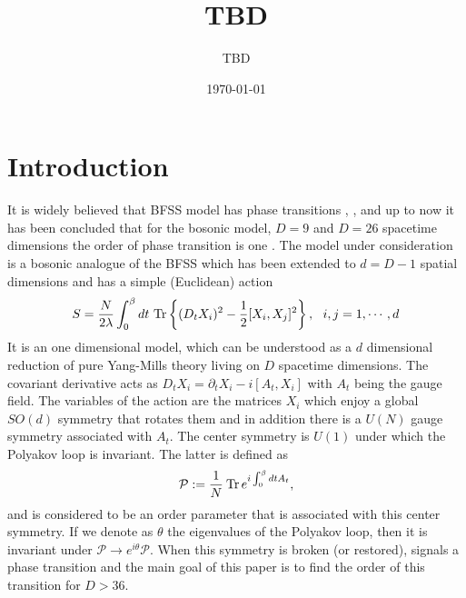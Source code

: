 \documentclass[11pt,english]{article}
\newcommand{\be}{\begin{equation}}
\newcommand{\ee}{\end{equation}}
\newcommand{\p}{\partial}
\newcommand{\Tr}[1]{\:{\rm Tr}\,#1}
\numberwithin{equation}{section}
\begin{document}
	\title{TBD}
\author{TBD}  


\date{\today}

\maketitle

\begin{abstract}
	
\end{abstract}

\newpage


\section{Introduction}
It is widely believed that BFSS model \cite{Banks1997} has phase transitions \cite{Hanada2019}, \cite{Aharony2004}, and up to now it has been concluded that for the bosonic model, $D=9$ and $D=26$ spacetime dimensions the order of phase transition is one \cite{Bergner2019}. The model under consideration is a bosonic analogue  of the BFSS which has been extended to $d=D-1$ spatial dimensions and has a simple (Euclidean) action
\be 
S = \frac{N}{2\lambda}\int_0^\beta dt\ {\rm Tr}\left\{(D_t X_i)^2 -\frac{1}{2}[X_i,X_j]^2 \right\},~~i,j=1,\cdots,d
\ee 
It is an one dimensional model, which can be understood as a $d$ dimensional reduction of pure Yang-Mills theory living on $D$ spacetime dimensions. The covariant derivative acts as $D_tX_i=\p_tX_i-i[A_t,X_i]$ with $A_t$ being the gauge field.  The variables of the action are the matrices $X_i$ which enjoy a global $SO(d)$ symmetry that rotates them and in addition there is a $U(N)$ gauge symmetry associated with $A_t$.  The center symmetry is $U(1)$ under which the Polyakov loop is invariant. The latter is defined as  
\be 
\mathcal{P}:=\frac{1}{N}\Tr e^{i\int_0^\beta dt A_t},
\ee 
and is considered to be an order parameter that is associated with this center symmetry. If we denote as $\theta$ the eigenvalues of the Polyakov loop, then it is invariant under $\mathcal{P}\to e^{i\theta}\mathcal{P}$.  When this symmetry is broken (or restored), signals a phase transition and the main goal of this paper is to find the order of this transition for $D>36$. 
\end{document}
